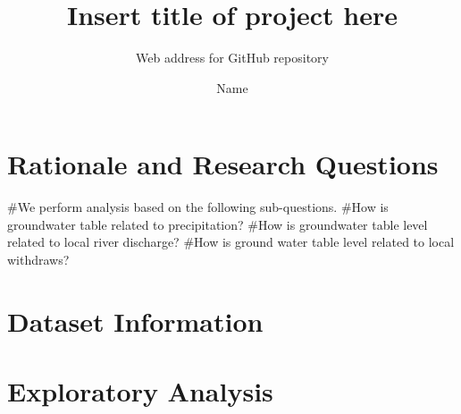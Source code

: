 \documentclass[
  12pt,
]{article}
\title{Insert title of project here}
\subtitle{Web address for GitHub repository}
\author{Name}
\date{}
\newenvironment{Shaded}{\begin{snugshade}}{\end{snugshade}}
\newcommand{\AttributeTok}[1]{\textcolor[rgb]{0.77,0.63,0.00}{#1}}
\newcommand{\CommentTok}[1]{\textcolor[rgb]{0.56,0.35,0.01}{\textit{#1}}}
\newcommand{\DecValTok}[1]{\textcolor[rgb]{0.00,0.00,0.81}{#1}}
\newcommand{\FunctionTok}[1]{\textcolor[rgb]{0.00,0.00,0.00}{#1}}
\newcommand{\NormalTok}[1]{#1}
\newcommand{\OtherTok}[1]{\textcolor[rgb]{0.56,0.35,0.01}{#1}}
\newcommand{\SpecialCharTok}[1]{\textcolor[rgb]{0.00,0.00,0.00}{#1}}
\newcommand{\StringTok}[1]{\textcolor[rgb]{0.31,0.60,0.02}{#1}}
\begin{document}
\maketitle

\newpage
\tableofcontents

\newpage
\listoftables

\newpage
\listoffigures

\newpage

\hypertarget{rationale-and-research-questions}{%
\section{Rationale and Research
Questions}\label{rationale-and-research-questions}}

\#We perform analysis based on the following sub-questions. \#How is
groundwater table related to precipitation? \#How is groundwater table
level related to local river discharge? \#How is ground water table
level related to local withdraws?

\newpage

\hypertarget{dataset-information}{%
\section{Dataset Information}\label{dataset-information}}

\newpage

\hypertarget{exploratory-analysis}{%
\section{Exploratory Analysis}\label{exploratory-analysis}}

\begin{Shaded}
\end{Shaded}
\end{document}
